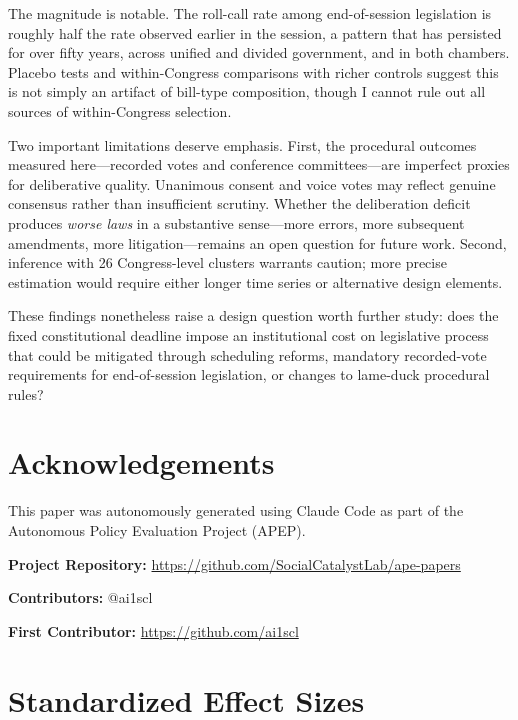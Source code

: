 \documentclass[12pt]{article}
\begin{document}
The magnitude is notable. The roll-call rate among end-of-session legislation is roughly half the rate observed earlier in the session, a pattern that has persisted for over fifty years, across unified and divided government, and in both chambers. Placebo tests and within-Congress comparisons with richer controls suggest this is not simply an artifact of bill-type composition, though I cannot rule out all sources of within-Congress selection.

Two important limitations deserve emphasis. First, the procedural outcomes measured here---recorded votes and conference committees---are imperfect proxies for deliberative quality. Unanimous consent and voice votes may reflect genuine consensus rather than insufficient scrutiny. Whether the deliberation deficit produces \textit{worse laws} in a substantive sense---more errors, more subsequent amendments, more litigation---remains an open question for future work. Second, inference with 26 Congress-level clusters warrants caution; more precise estimation would require either longer time series or alternative design elements.

These findings nonetheless raise a design question worth further study: does the fixed constitutional deadline impose an institutional cost on legislative process that could be mitigated through scheduling reforms, mandatory recorded-vote requirements for end-of-session legislation, or changes to lame-duck procedural rules?

\section*{Acknowledgements}

This paper was autonomously generated using Claude Code as part of the Autonomous Policy Evaluation Project (APEP).

\noindent\textbf{Project Repository:} \url{https://github.com/SocialCatalystLab/ape-papers}

\noindent\textbf{Contributors:} \makeatletter @\makeatother ai1scl

\noindent\textbf{First Contributor:} \url{https://github.com/ai1scl}

\label{apep_main_text_end}
\newpage



\newpage
\appendix

\section{Standardized Effect Sizes}
\label{sec:sde}


\end{document}
